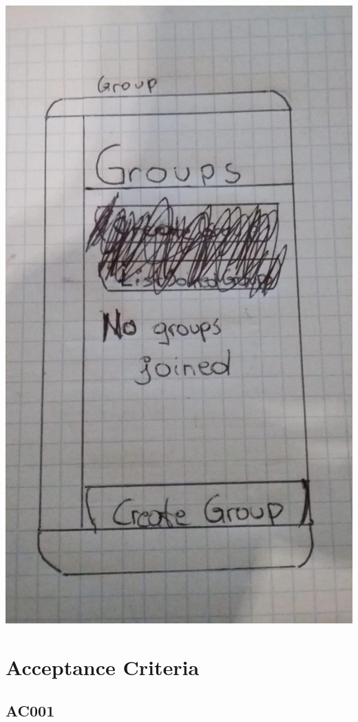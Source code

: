 \documentclass[12pt]{article}
\theoremstyle{definition}
\begin{document}
\includegraphics[scale=.2]{Gui/group.jpeg}

\pagebreak


\section{Acceptance Criteria}

\subsection{AC001}
\end{document}
